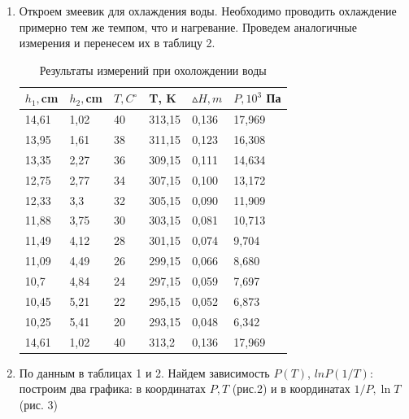 \documentclass[a4paper, 12pt]{article}
\theoremstyle{plain} %
\theoremstyle{definition} %
\theoremstyle{remark} %
\begin{document}
\begin{enumerate}
\newpage
\item
Откроем змеевик для охлаждения воды. Необходимо проводить охлаждение примерно тем же темпом, что и нагревание. Проведем аналогичные измерения и перенесем их в таблицу 2.

\begin{table}[h]

\begin{center}
\label{my-label}
\begin{tabular}{|l|l|l|l|l|l|}
\hline
\textbf{$h_1, $cm} &\textbf{$h_2, $cm} & \textbf{$T, C^{\circ}$} & \textbf{T, K}  & \textbf{$\vartriangle H, m$} & \textbf{$P, 10^3 $ Па} \\ \hline
14,61 & 1,02 & 40 & 313,15 & 0,136 & 17,969                     \\
13,95 & 1,61 & 38 & 311,15 & 0,123 & 16,308                      \\
13,35 & 2,27 & 36 & 309,15 & 0,111 & 14,634                      \\
12,75 & 2,77 & 34 & 307,15 & 0,100 & 13,172                       \\
12,33 & 3,3  & 32 & 305,15 & 0,090 & 11,909                     	\\
11,88 & 3,75 & 30 & 303,15 & 0,081 & 10,713                   \\
11,49 & 4,12 & 28 & 301,15 & 0,074 & 9,704                  \\
11,09 & 4,49 & 26 & 299,15 & 0,066 & 8,680                     \\
10,7  & 4,84 & 24 & 297,15 & 0,059 & 7,697                    \\
10,45 & 5,21 & 22 & 295,15 & 0,052 & 6,873                    \\
10,25 & 5,41 & 20 & 293,15 & 0,048 & 6,342 						\\
14,61 & 1,02 & 40 & 313,2  & 0,136 & 17,969                    \\
 \hline
\end{tabular}
\label{table:table2}
\caption{Результаты измерений при охолождении воды}
\end{center}
\end{table}
\item
По данным в таблицах 1 и 2. Найдем зависимость $P(T)$, $lnP(1/T)$:
построим два графика: в координатах $P, T$ (рис.2) и в координатах $1/P, \ln T$ (рис. 3)\\


\end{enumerate}
\end{document}

